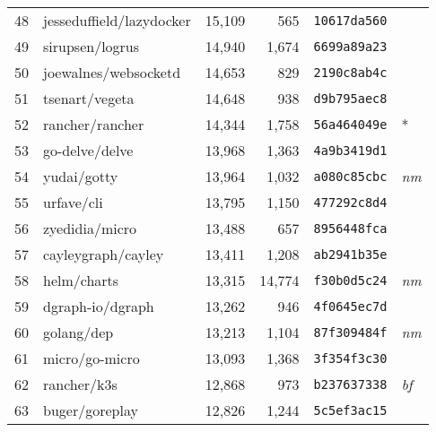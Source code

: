 {\begin{supertabular}{llrrll}
        48  &           jesseduffield/lazydocker & 15,109 &    565 &  \texttt{10617da560} &              \\
        49  &                    sirupsen/logrus & 14,940 &  1,674 &  \texttt{6699a89a23} &              \\
        50  &               joewalnes/websocketd & 14,653 &    829 &  \texttt{2190c8ab4c} &              \\
        51  &                     tsenart/vegeta & 14,648 &    938 &  \texttt{d9b795aec8} &              \\
        52  &                    rancher/rancher & 14,344 &  1,758 &  \texttt{56a464049e} &            * \\
        53  &                     go-delve/delve & 13,968 &  1,363 &  \texttt{4a9b3419d1} &              \\
        54  &                        yudai/gotty & 13,964 &  1,032 &  \texttt{a080c85cbc} &  \textit{nm} \\
        55  &                         urfave/cli & 13,795 &  1,150 &  \texttt{477292c8d4} &              \\
        56  &                     zyedidia/micro & 13,488 &    657 &  \texttt{8956448fca} &              \\
        57  &                 cayleygraph/cayley & 13,411 &  1,208 &  \texttt{ab2941b35e} &              \\
        58  &                        helm/charts & 13,315 & 14,774 &  \texttt{f30b0d5c24} &  \textit{nm} \\
        59  &                   dgraph-io/dgraph & 13,262 &    946 &  \texttt{4f0645ec7d} &              \\
        60  &                         golang/dep & 13,213 &  1,104 &  \texttt{87f309484f} &  \textit{nm} \\
        61  &                     micro/go-micro & 13,093 &  1,368 &  \texttt{3f354f3c30} &              \\
        62  &                        rancher/k3s & 12,868 &    973 &  \texttt{b237637338} &  \textit{bf} \\
        63  &                     buger/goreplay & 12,826 &  1,244 &  \texttt{5c5ef3ac15} &              \\

\end{supertabular}}
